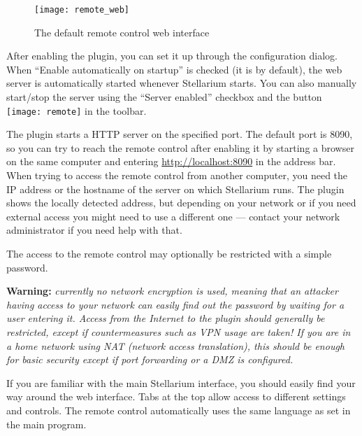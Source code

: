 \begin{figure}[h]
\centering\texttt{[image: remote\_web]}
\caption{The default remote control web interface}
\end{figure}

After enabling the plugin, you can set it up through the configuration dialog. 
When ``Enable automatically on startup'' is checked (it is by default), the web 
server is automatically started whenever Stellarium starts. You can also 
manually start/stop the server using the ``Server enabled'' checkbox and the 
button \texttt{[image: remote]} in the toolbar.

The plugin starts a HTTP server on the specified port. The default port is 
8090, so you can try to reach the remote control after enabling it by starting 
a browser on the same computer and entering \url{http://localhost:8090} in the 
address bar. When trying to access the remote control from another computer, 
you need the IP address or the hostname of the server on which Stellarium runs. 
The plugin shows the locally detected address, but depending on your network or 
if you need external access you might need to use a different one 
--- contact your network administrator if you need help with that.

The access to the remote control may optionally be restricted with a simple 
password.

\textbf{Warning:} \emph{currently no network encryption is used, meaning that 
an attacker having access to your network can easily find out the password by 
waiting for a user entering it. Access from the Internet to the 
plugin should generally be restricted, except if countermeasures such as VPN 
usage are taken! If you are in a home network using NAT (network access 
translation), this should be enough for basic security except if port 
forwarding or a DMZ is configured.}

If you are familiar with the main Stellarium interface, you should easily find 
your way around the web interface. Tabs at the top allow access to 
different settings and controls. The remote control automatically uses the 
same language as set in the main program.


